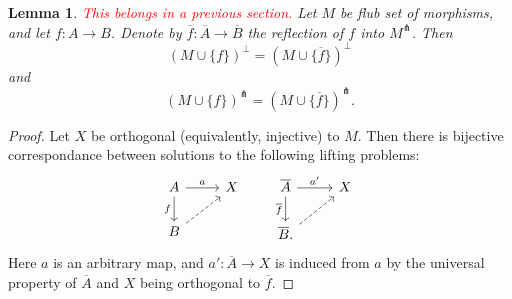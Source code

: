 \documentclass[a4paper]{article}
\newcommand{\todo}[1]{\textcolor{red}{#1}}
\newtheorem{lemma}[theorem]{Lemma}
\theoremstyle{remark}
\theoremstyle{definition}
\begin{document}
\begin{lemma}
  \todo{This belongs in a previous section.}
  Let $M$ be flub set of morphisms, and let $f : A \rightarrow B$.
  Denote by $\overline{f} : \overline{A} \rightarrow \overline{B}$ the reflection of $f$ into $M^\pitchfork$.
  Then
  \begin{equation}
    (M \cup \{ f \})^\perp = (M \cup \{ \overline{f} \})^\perp
  \end{equation}
  and
  \begin{equation}
    (M \cup \{ f \})^\pitchfork = (M \cup \{ \overline{f} \})^\pitchfork.
  \end{equation}
\end{lemma}
\begin{proof}
  Let $X$ be orthogonal (equivalently, injective) to $M$.
  Then there is bijective correspondance between solutions to the following lifting problems:
  \begin{equation}
    \begin{tikzcd}    
      A \arrow[r, "a"] \arrow[d, "f"'] & X \\
      B \arrow[ur, dashed]
    \end{tikzcd}    
    \qquad
    \begin{tikzcd}    
      \overline{A} \arrow[r, "a'"] \arrow[d, "\overline{f}"'] & X \\
      \overline{B}. \arrow[ur, dashed]
    \end{tikzcd}    
  \end{equation}
  Here $a$ is an arbitrary map, and $a' : \overline{A} \rightarrow X$ is induced from $a$ by the universal property of $\overline{A}$ and $X$ being orthogonal to $\overline{f}$.
\end{proof}
\end{document}
